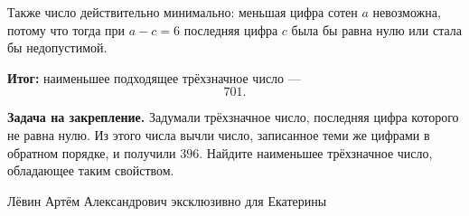 \documentclass[12pt,a4paper]{article}
\begin{document}
Также число действительно минимально: меньшая цифра сотен $a$ невозможна, потому что тогда при $a-c=6$ последняя цифра $c$ была бы равна нулю или стала бы недопустимой.

\textcolor{teal!60!black}{\textbf{Итог:}}
наименьшее подходящее трёхзначное число ---
\[
\boxed{701}.
\]

\textbf{Задача на закрепление.}
Задумали трёхзначное число, последняя цифра которого не равна нулю. Из этого числа вычли число, записанное теми же цифрами в обратном порядке, и получили $396$. Найдите наименьшее трёхзначное число, обладающее таким свойством.

\vfill
\begin{center}
\small Лёвин Артём Александрович эксклюзивно для Екатерины
\end{center}
\end{document}
